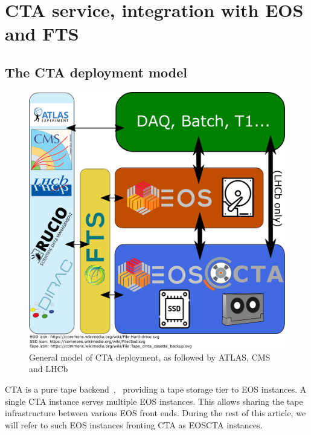 \documentclass{webofc}
\begin{document}
\section{CTA service, integration with EOS and FTS}
\subsection{The CTA deployment model}

\begin{figure}
   \includegraphics[width=\linewidth]{images/withNewLogo/CTA_Deployment_Atlas_CMS_LHCb}
   \caption{General model of CTA deployment, as followed by ATLAS, CMS and LHCb}
   \label{fig:general_deployment}
\end{figure}

CTA is a pure tape backend~\citep{cta_chep2016},~\cite{cta_chep2018} providing a tape storage tier to EOS instances.
A single CTA instance serves multiple EOS instances. This allows sharing the tape infrastructure
between various EOS front ends. During the rest of this article, we will refer to such EOS instances fronting CTA as
EOSCTA instances.
\end{document}
